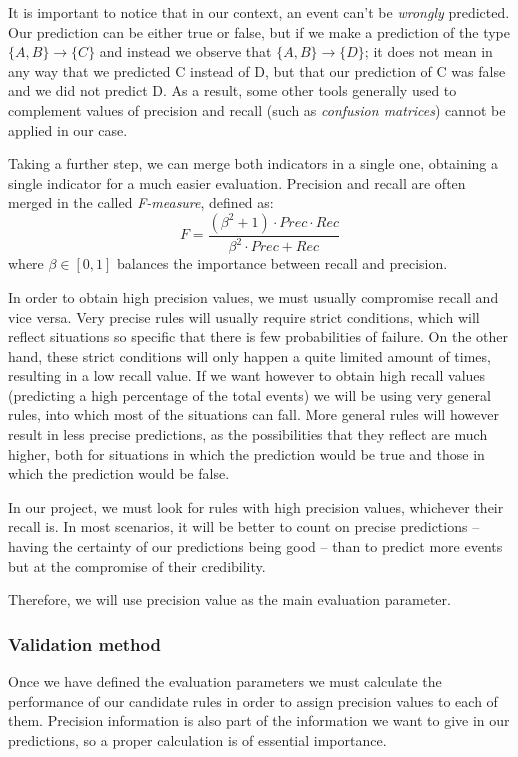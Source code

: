 \documentclass[a4paper,12pt]{article}
\begin{document}
It is important to notice that in our context, an event can't be \emph{wrongly} predicted. Our prediction can be either true or false, but if we make a prediction of the type $\{A, B\} \longrightarrow \{C\}$ and instead we observe that $\{A, B\} \longrightarrow \{D\}$; it does not mean in any way that we predicted C instead of D, but that our prediction of C was false and we did not predict D. As a result, some other tools generally used to complement values of precision and recall (such as \emph{confusion matrices}) cannot be applied in our case.

Taking a further step, we can merge both indicators in a single one, obtaining a single indicator for a much easier evaluation. Precision and recall are often merged in the called \emph{F-measure}, defined as:
\begin{equation}
F = \dfrac{(\beta^{2}+1) \cdot Prec \cdot Rec}{\beta^{2} \cdot Prec+Rec}
\end{equation}
where $\beta\in [0,1]$ balances the importance between recall and precision.

In order to obtain high precision values, we must usually compromise recall and vice versa. Very precise rules will usually require strict conditions, which will reflect situations so specific that there is few probabilities of failure. On the other hand, these strict conditions will only happen a quite limited amount of times, resulting in a low recall value. If we want however to obtain high recall values (predicting a high percentage of the total events) we will be using very general rules, into which most of the situations can fall. More general rules will however result in less precise predictions, as the possibilities that they reflect are much higher, both for situations in which the prediction would be true and those in which the prediction would be false.

In our project, we must look for rules with high precision values, whichever their recall is. In most scenarios, it will be better to count on precise predictions -- having the certainty of our predictions being good -- than to predict more events but at the compromise of their credibility.

Therefore, we will use precision value as the main evaluation parameter.

\subsubsection{Validation method}
Once we have defined the evaluation parameters we must calculate the performance of our candidate rules in order to assign precision values to each of them. Precision information is also part of the information we want to give in our predictions, so a proper calculation is of essential importance.
\end{document}
